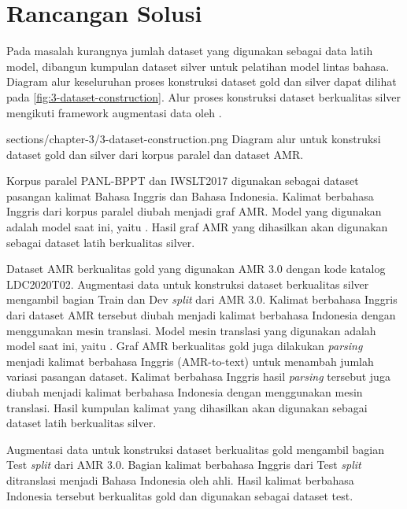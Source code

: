 \section{Rancangan Solusi}

Pada masalah kurangnya jumlah dataset yang digunakan sebagai data latih model, dibangun kumpulan dataset silver untuk pelatihan model \amrparsing{} lintas bahasa.
Diagram alur keseluruhan proses konstruksi dataset gold dan silver dapat dilihat pada \cref{fig:3-dataset-construction}.
Alur proses konstruksi dataset berkualitas silver mengikuti framework augmentasi data oleh \textcite{lee2022}.

  {sections/chapter-3/3-dataset-construction.png}
  {Diagram alur untuk konstruksi dataset gold dan silver dari korpus paralel dan dataset AMR.}

Korpus paralel PANL-BPPT dan IWSLT2017 digunakan sebagai dataset pasangan kalimat Bahasa Inggris dan Bahasa Indonesia.
Kalimat berbahasa Inggris dari korpus paralel diubah menjadi graf \gls{AMR}.
Model \amrparsing{} yang digunakan adalah model \sota{} saat ini, yaitu .
Hasil graf \gls{AMR} yang dihasilkan akan digunakan sebagai dataset latih berkualitas silver.

Dataset \gls{AMR} berkualitas gold yang digunakan AMR 3.0 dengan kode katalog LDC2020T02.
Augmentasi data untuk konstruksi dataset berkualitas silver mengambil bagian Train dan Dev \textit{split} dari AMR 3.0.
Kalimat berbahasa Inggris dari dataset \gls{AMR} tersebut diubah menjadi kalimat berbahasa Indonesia dengan menggunakan mesin translasi.
Model mesin translasi yang digunakan adalah model \sota{} saat ini, yaitu \todo{}.
Graf \gls{AMR} berkualitas gold juga dilakukan \textit{parsing} menjadi kalimat berbahasa Inggris (AMR-to-text) untuk menambah jumlah variasi pasangan dataset.
Kalimat berbahasa Inggris hasil \textit{parsing} tersebut juga diubah menjadi kalimat berbahasa Indonesia dengan menggunakan mesin translasi.
Hasil kumpulan kalimat yang dihasilkan akan digunakan sebagai dataset latih berkualitas silver.

Augmentasi data untuk konstruksi dataset berkualitas gold mengambil bagian Test \textit{split} dari AMR 3.0.
Bagian kalimat berbahasa Inggris dari Test \textit{split} ditranslasi menjadi Bahasa Indonesia oleh ahli.
Hasil kalimat berbahasa Indonesia tersebut berkualitas gold dan digunakan sebagai dataset test.
